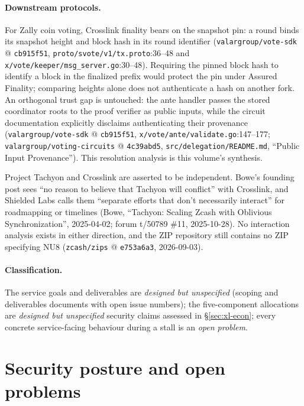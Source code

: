 \documentclass[11pt,a4paper]{article}
\theoremstyle{definition}
\begin{document}
\paragraph{Downstream protocols.} For Zally coin voting, Crosslink finality
bears on the snapshot pin: a round binds its snapshot height and block hash
in its round identifier (\texttt{valargroup/\allowbreak vote-sdk} @
\texttt{cb915f51},
\texttt{proto/svote/v1/tx.proto}:36--48 and
\texttt{x/vote/keeper/msg\_server.go}:30--48). Requiring the pinned block
hash to identify a block in the finalized prefix would protect the pin
under Assured Finality; comparing heights alone does not authenticate a
hash on another fork. An orthogonal trust gap is untouched:
the ante handler passes the stored coordinator roots to the proof verifier
as public inputs, while the circuit documentation explicitly disclaims
authenticating their provenance
(\texttt{valargroup/\allowbreak vote-sdk} @ \texttt{cb915f51},
\texttt{x/vote/ante/validate.go}:147--177;
\texttt{valargroup/\allowbreak voting-circuits} @ \texttt{4c39abd5},
\texttt{src/delegation/README.md}, ``Public Input Provenance''). This
resolution analysis is this volume's synthesis.

Project Tachyon and Crosslink are asserted to be independent. Bowe's founding
post sees ``no reason to believe that Tachyon will conflict'' with Crosslink,
and Shielded Labs calls them ``separate efforts that don't necessarily
interact'' for roadmapping or timelines (Bowe, ``Tachyon: Scaling Zcash with
Oblivious Synchronization'', 2025-04-02; forum t/50789 \#11, 2025-10-28).
No interaction analysis exists in either direction, and the ZIP repository
still contains no ZIP specifying NU8 (\texttt{zcash/zips} @
\texttt{e753a6a3}, 2026-09-03).

\paragraph{Classification.} The service goals and deliverables are
\emph{designed but unspecified} (scoping and deliverables documents with
open issue numbers); the five-component allocations are \emph{designed
but unspecified} security claims assessed in \S\ref{sec:xl-econ};
every concrete service-facing behaviour during a stall is an \emph{open
problem}.

\section{Security posture and open problems}\label{sec:xl-security}
\end{document}
